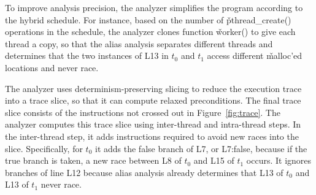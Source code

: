 
To improve analysis precision, the analyzer simplifies the program according to the
hybrid schedule.  For instance, based on the number of
\v{pthread\_create()} operations in the schedule, the analyzer
clones function \v{worker()} to give each thread a copy,
so that the alias analysis separates different threads and determines that
the two instances of L13 in $t_0$ and $t_1$ access different
\v{malloc}'ed locations and never race.



The analyzer uses
determinism-preserving slicing to reduce the execution trace into a trace
slice, so that it can compute relaxed preconditions.
The final trace slice consists of the instructions not crossed out
in Figure~\ref{fig:trace}.
The analyzer computes this trace slice using inter-thread and 
intra-thread steps.  In the inter-thread step, it adds instructions
required to avoid new races into the slice.  Specifically, for $t_0$ it adds
the false branch of L7, or L7:false, because if the true branch
is taken, a new race between L8 of $t_0$ and L15 of $t_1$ occurs.  It
ignores branches of line L12 because alias analysis already determines that L13 of
$t_0$ and L13 of $t_1$ never race.

